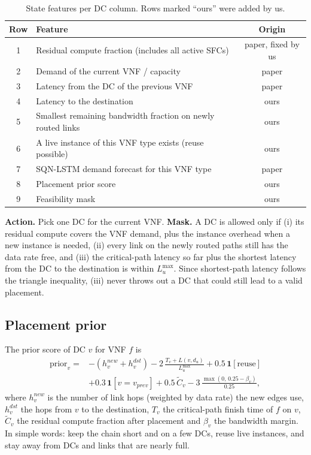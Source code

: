 \documentclass[11pt,a4paper]{article}
\newcommand{\ours}[1]{\textcolor[HTML]{1B7F5A}{#1}}
\begin{document}
\begin{table}[H]
\centering\small
\caption{State features per DC column. Rows marked ``ours'' were added by us.}
\label{tab:state}
\begin{tabular}{clc}
\toprule
Row & Feature & Origin \\
\midrule
1 & Residual compute fraction (includes all active SFCs) & paper, fixed by us \\
2 & Demand of the current VNF / capacity & paper \\
3 & Latency from the DC of the previous VNF & paper \\
4 & Latency to the destination & \ours{ours} \\
5 & Smallest remaining bandwidth fraction on newly routed links & \ours{ours} \\
6 & A live instance of this VNF type exists (reuse possible) & \ours{ours} \\
7 & SQN-LSTM demand forecast for this VNF type & paper \\
8 & Placement prior score & \ours{ours} \\
9 & Feasibility mask & \ours{ours} \\
\bottomrule
\end{tabular}
\end{table}

\textbf{Action.} Pick one DC for the current VNF. \textbf{Mask.} A DC is
allowed only if (i) its residual compute covers the VNF demand, plus the
instance overhead when a new instance is needed, (ii) every link on the newly
routed paths still has the data rate free, and (iii) the critical-path latency
so far plus the shortest latency from the DC to the destination is within
$L^{\max}_u$. Since shortest-path latency follows the triangle inequality, (iii)
never throws out a DC that could still lead to a valid placement.

\subsection{Placement prior}
The prior score of DC $v$ for VNF $f$ is
\begin{equation}
\begin{split}
\text{prior}_v ={}& -(h^{new}_v + h^{dst}_v) - 2\,\frac{T_v + L(v,d_u)}{L^{\max}_u}
 + 0.5\,\mathbf{1}[\text{reuse}] \\
 & + 0.3\,\mathbf{1}[v = v_{prev}] + 0.5\,\tilde{C}_v - 3\,\frac{\max(0,\,0.25-\beta_v)}{0.25},
\end{split}
\end{equation}
where $h^{new}_v$ is the number of link hops (weighted by data rate) the new
edges use, $h^{dst}_v$ the hops from $v$ to the destination, $T_v$ the
critical-path finish time of $f$ on $v$, $\tilde C_v$ the residual compute
fraction after placement and $\beta_v$ the bandwidth margin. In simple words:
keep the chain short and on a few DCs, reuse live instances, and stay away from
DCs and links that are nearly full.
\end{document}
